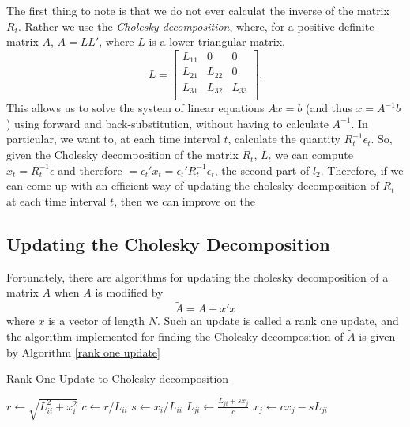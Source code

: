 \documentclass{article} %
\numberwithin{equation}{section} %
\numberwithin{figure}{section} %
\numberwithin{table}{section} %
\begin{document}
The first thing to note is that we do not ever calculat the inverse of the matrix $R_t$. Rather we use the \textit{Cholesky decomposition}, where, for a positive definite matrix $A$, $A = LL'$, where $L$ is a lower triangular matrix.
\begin{equation}
  L=
    \begin{bmatrix}
      L_{11} & 0      & 0       \\
      L_{21} & L_{22} & 0       \\
      L_{31} & L_{32} & L_{33}  \\
    \end{bmatrix}.
\end{equation}
This allows us to solve the system of linear equations $Ax = b$ (and thus $x = A^{-1}b$) using forward and back-substitution, without having to calculate $A^{-1}$. In particular, we want to, at each time interval $t$, calculate the quantity $R_t^{-1}\epsilon_t$. So, given the Cholesky decomposition of the matrix $R_t$, $\tilde{L}_t$ we can compute $x_t = R_t^{-1}\epsilon$ and therefore $ = \epsilon_t'x_t = \epsilon_t'R_t^{-1}\epsilon_t$, the second part of $l_2$. Therefore, if we can come up with an efficient way of updating the cholesky decomposition of $R_t$ at each time interval $t$, then we can improve on the

\subsection{Updating the Cholesky Decomposition}

Fortunately, there are algorithms for updating the cholesky decomposition of a matrix $A$ when $A$ is modified by
\begin{equation}
\tilde{A} = A + x'x
\end{equation}
where $x$ is a vector of length $N$. Such an update is called a rank one update, and the algorithm implemented for finding the Cholesky decomposition of $\tilde{A}$ is given by Algorithm \ref{rank one update}

\begin{algorithm}
\caption{Rank One Update to Cholesky decomposition}\label{rank one update}
\begin{algorithmic}[1]
\State $r \gets \sqrt{L_{ii}^2 + x_i^2}$
\State $c \gets r / L_{ii}$
\State $s \gets x_i/L_{ii}$
\State $L_{ji} \gets \frac{L_{ji} + sx_{j}}{c}$
\State $x_j \gets c x_j - sL_{ji}$
\EndFor
\EndFor
\EndProcedure
\end{algorithmic}
\end{algorithm}
\end{document}
